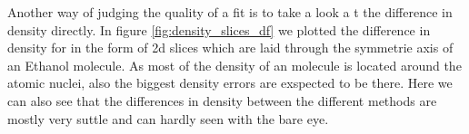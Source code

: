 Another way of judging the quality of a fit is to take a look a t the difference in density directly. In figure \ref{fig:density_slices_df} we plotted the difference in density for in the form of 2d slices which are laid through the symmetrie axis of an Ethanol molecule. As most of the density of an molecule is located around the atomic nuclei, also the biggest density errors are exspected to be there. Here we can also see that the differences in density between the different methods are mostly very suttle and can hardly seen with the bare eye.







